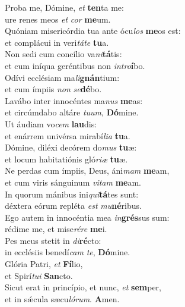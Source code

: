 \evenverse Proba me, Dómine, \textit{et} \textbf{ten}ta me:~\*\\
\evenverse ure renes meos \textit{et} \textit{cor} \textbf{me}um.\\
\oddverse Quóniam misericórdia tua ante ócu\textit{los} \textbf{me}os est:~\*\\
\oddverse et complácui in veri\textit{tá}\textit{te} \textbf{tu}a.\\
\evenverse Non sedi cum concílio va\textit{ni}\textbf{tá}tis:~\*\\
\evenverse et cum iníqua geréntibus non \textit{in}\textit{tro}\textbf{í}bo.\\
\oddverse Odívi ecclésiam ma\textit{li}\textbf{gnán}tium:~\*\\
\oddverse et cum ímpiis \textit{non} \textit{se}\textbf{dé}bo.\\
\evenverse Lavábo inter innocéntes ma\textit{nus} \textbf{me}as:~\*\\
\evenverse et circúmdabo altáre \textit{tu}\textit{um}, \textbf{Dó}mine.\\
\oddverse Ut áudiam vo\textit{cem} \textbf{lau}dis:~\*\\
\oddverse et enárrem univérsa mirabí\textit{li}\textit{a} \textbf{tu}a.\\
\evenverse Dómine, diléxi decórem do\textit{mus} \textbf{tu}æ:~\*\\
\evenverse et locum habitatiónis gló\textit{ri}\textit{æ} \textbf{tu}æ.\\
\oddverse Ne perdas cum ímpiis, Deus, áni\textit{mam} \textbf{me}am,~\*\\
\oddverse et cum viris sánguinum \textit{vi}\textit{tam} \textbf{me}am.\\
\evenverse In quorum mánibus ini\textit{qui}\textbf{tá}tes sunt:~\*\\
\evenverse déxtera eórum repléta \textit{est} \textit{mu}\textbf{né}ribus.\\
\oddverse Ego autem in innocéntia mea \textit{in}\textbf{grés}sus sum:~\*\\
\oddverse rédime me, et mise\textit{ré}\textit{re} \textbf{me}i.\\
\evenverse Pes meus stetit in \textit{di}\textbf{ré}cto:~\*\\
\evenverse in ecclésiis benedí\textit{cam} \textit{te}, \textbf{Dó}mine.\\
\oddverse Glória Patri, \textit{et} \textbf{Fí}lio,~\*\\
\oddverse et Spirí\textit{tu}\textit{i} \textbf{San}cto.\\
\evenverse Sicut erat in princípio, et nunc, \textit{et} \textbf{sem}per,~\*\\
\evenverse et in sǽcula sæcu\textit{ló}\textit{rum}. \textbf{A}men.\\
